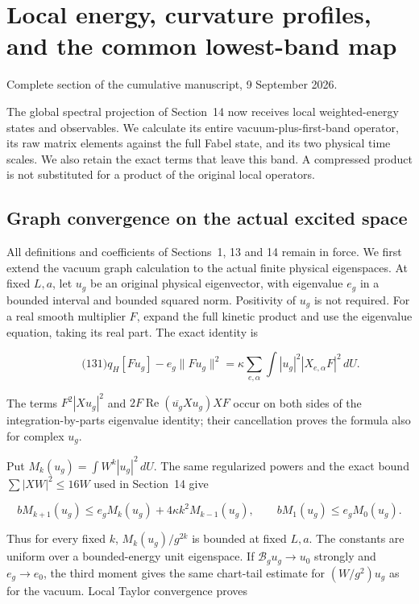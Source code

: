 \section{Local energy, curvature profiles, and the common lowest-band
map}\label{local-energy-band-transfer-md-local-energy-curvature-profiles-and-the-common-lowest-band-map}

Complete section of the cumulative manuscript, 9 September 2026.

The global spectral projection of Section~14 now receives local
weighted-energy states and observables. We calculate its entire
vacuum-plus-first-band operator, its raw matrix elements against the
full Fabel state, and its two physical time scales. We also retain the
exact terms that leave this band. A compressed product is not
substituted for a product of the original local operators.

\subsection{Graph convergence on the actual excited
space}\label{local-energy-band-transfer-md-graph-convergence-on-the-actual-excited-space}

All definitions and coefficients of Sections~1, 13 and 14 remain in
force. We first extend the vacuum graph calculation to the actual finite
physical eigenspaces. At fixed \(L,a\), let \(u_g\) be an original
physical eigenvector, with eigenvalue \(e_g\) in a bounded interval and
bounded squared norm. Positivity of \(u_g\) is not required. For a real
smooth multiplier \(F\), expand the full kinetic product and use the
eigenvalue equation, taking its real part. The exact identity is

\[
\qquad\text{(131)}
 q_H[Fu_g]-e_g\|Fu_g\|^2
 =\kappa\sum_{e,\alpha}\int |u_g|^2|X_{e,\alpha}F|^2\,dU.
\]

The terms \(F^2|Xu_g|^2\) and
\(2F\operatorname{Re}(\overline{u_g}Xu_g)XF\) occur on both sides of the
integration-by-parts eigenvalue identity; their cancellation proves the
formula also for complex \(u_g\).

Put \(M_k(u_g)=\int W^k|u_g|^2\,dU\). The same regularized powers and
the exact bound \(\sum|XW|^2\le16W\) used in Section~14 give

\[
bM_{k+1}(u_g)\le e_gM_k(u_g)+4\kappa k^2M_{k-1}(u_g),
 \qquad bM_1(u_g)\le e_gM_0(u_g).
\]

Thus for every fixed \(k\), \(M_k(u_g)/g^{2k}\) is bounded at fixed
\(L,a\). The constants are uniform over a bounded-energy unit
eigenspace. If \(\mathcal B_gu_g\to u_0\) strongly and \(e_g\to e_0\),
the third moment gives the same chart-tail estimate for \((W/g^2)u_g\)
as for the vacuum. Local Taylor convergence proves


